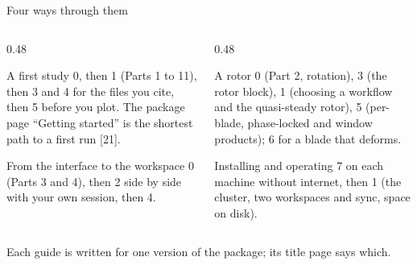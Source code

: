 \begin{frame}{Four ways through them}
\begin{columns}[T]
\begin{column}{0.48\textwidth}
\begin{block}{A first study}
\small 0, then 1 (Parts 1 to 11), then 3 and 4 for the files you cite, then 5
before you plot. The package page ``Getting started'' is the shortest path to
a first run [21].
\end{block}
\begin{block}{From the interface to the workspace}
\small 0 (Parts 3 and 4), then 2 side by side with your own session, then 4.
\end{block}
\end{column}
\begin{column}{0.48\textwidth}
\begin{block}{A rotor}
\small 0 (Part 2, rotation), 3 (the rotor block), 1 (choosing a workflow and
the quasi-steady rotor), 5 (per-blade, phase-locked and window products); 6
for a blade that deforms.
\end{block}
\begin{block}{Installing and operating}
\small 7 on each machine without internet, then 1 (the cluster, two
workspaces and sync, space on disk).
\end{block}
\end{column}
\end{columns}
\begin{takeaway}Each guide is written for one version of the package; its
title page says which.\end{takeaway}
\end{frame}

